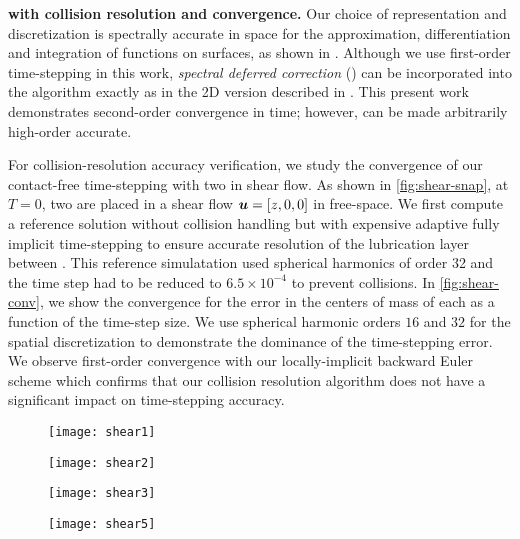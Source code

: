 \textbf{\rbcs with collision resolution and convergence. }
Our choice of \rbc  representation and discretization is spectrally
accurate in space for the approximation, differentiation and
integration of functions on \rbc  surfaces, as shown in
\cite{Veerapaneni2011}. Although we use first-order time-stepping in
this work,   \emph{spectral deferred correction} () can be
incorporated into the algorithm exactly as in the 2D version described
in  \cite{lu2017}. This present work demonstrates second-order convergence in
time; however,  can be made arbitrarily high-order
accurate.

For collision-resolution accuracy verification, we study the
convergence of our contact-free time-stepping with two \rbcs in shear
flow. As shown in \cref{fig:shear-snap}, at $T=0$, two \rbcs are
placed in a
shear flow ${\bm{u}} = [z,0,0]$ in free-space. %
We first compute a reference solution without
collision handling  but with expensive adaptive fully implicit time-stepping to
ensure accurate resolution of the lubrication
layer between \rbcs. This reference simulatation used spherical
harmonics of order 32 and the time step had to be reduced to
$6.5\times 10^{-4}$ to prevent collisions.
In \cref{fig:shear-conv}, we show the convergence for the error in the centers of mass of each \rbc as a function of the time-step size. 
We use spherical harmonic orders $16$ and $32$ for the spatial
discretization to demonstrate the dominance of the time-stepping error. 
We observe first-order convergence with our locally-implicit backward Euler scheme which confirms that our collision resolution algorithm does not have a significant impact on time-stepping accuracy.
\begin{figure}[!htb]
  \centering
  \hfill
  \begin{minipage}{.25\textwidth}
      \centering
    \texttt{[image: shear1]}
  \end{minipage}\hfill
  \begin{minipage}{.25\textwidth}
      \centering
    \texttt{[image: shear2]}
  \end{minipage}\hfill
  \begin{minipage}{.25\textwidth}
      \centering
    \texttt{[image: shear3]}
  \end{minipage}\hfill
  \begin{minipage}{.25\textwidth}
      \centering
    \texttt{[image: shear5]}
  \end{minipage}\hfill
\end{figure}%

